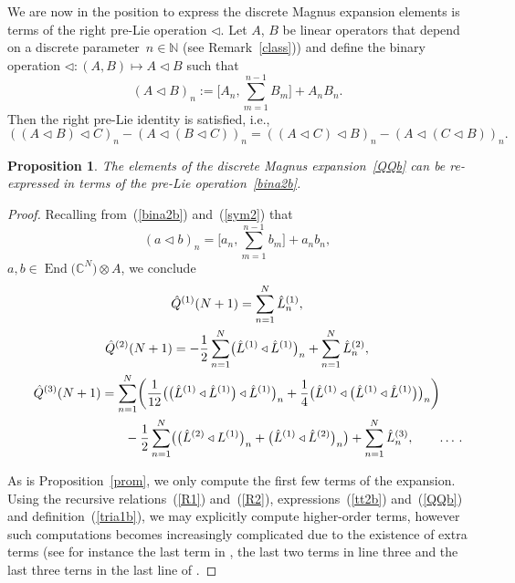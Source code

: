 \documentclass[10pt,a4paper]{amsart}
\numberwithin{equation}{section}
\newtheorem{pro}[thm]{Proposition}
\theoremstyle{definition}
\DeclareMathOperator{\EEnd}{End}%
\def\mathfrak#1{#1}%
\def\mathcal#1{#1}%
\begin{document}
We are now in the position to express the discrete Magnus
expansion elements is terms of the right pre-Lie operation $\triangleleft$.
Let $A$, $B$ be linear operators that depend on a discrete parameter~${n\in {\mathbb N}}$ (see Remark~\ref{class}))
and define the binary operation
$ \triangleleft\colon (A, B) \mapsto A \triangleleft B$ such that
\begin{equation}
(A\triangleleft B)_n := \Biggl[A_n, \sum_{m=1}^{n-1} B_m \Biggr] +A_n B_n. \label{bina2b}
\end{equation}
Then the right pre-Lie identity is satisfied, i.e.,
\begin{equation}
( (A \triangleleft B) \triangleleft C)_n- ( A \triangleleft (B \triangleleft C))_n =( (A \triangleleft C) \triangleleft B)_n- (A \triangleleft(C \triangleleft B))_n. \label{sym2}
\end{equation}

\begin{pro}
The elements of the discrete Magnus expansion~\eqref{QQb} can be re-expressed in terms of the pre-Lie operation~\eqref{bina2b}.
\end{pro}
\begin{proof}
Recalling from~(\ref{bina2b}) and~(\ref{sym2}) that
\begin{equation}
(a \triangleleft b)_n = \Biggl[a_n, \sum_{m=1}^{n-1}b_m\Biggr] + a_n b_n, \label{tria1b}
\end{equation}
$a,b \in \EEnd\bigl({\mathbb C}^{\mathcal N}\bigr) \otimes {\mathfrak A}$, we conclude
\begin{gather*}
 \hat {\mathcal Q}^{(1)}(N+1) = \sum_{n=1}^N\hat L^{(1)}_n, \cr
 \hat {\mathcal Q}^{(2)}(N+1) =-\frac{1}{2} \sum_{n=1}^N
 \bigl(\hat L^{(1)} \triangleleft \hat L^{(1)}\bigr)_n +\sum_{n=1}^N\hat L_n^{(2)},\nonumber\\
 \hat {\mathcal Q}^{(3)}(N+1)= \sum_{n=1}^N\biggl(
\frac{1}{12} \bigl(\bigl(\hat L^{(1)} \triangleleft \hat L^{(1)}\bigr) \triangleleft \hat L^{(1)}\bigr)_n +\frac{1}{4}
\bigl(\hat L^{(1)} \triangleleft \bigl(\hat L^{(1)} \triangleleft \hat L^{(1)}\bigr)\bigr)_n \biggr)\cr
\hphantom{\hat {\mathcal Q}^{(3)}(N+1)= \sum_{n=1}^N\biggl(}{}
 -\frac{1}{2} \sum_{n=1}^N\bigl(\bigl(\hat L^{(2)} \triangleleft L^{(1)}\bigr)_n+ \bigl(\hat L^{(1)}\triangleleft \hat L^{(2)}\bigr)_n\bigr)
+ \sum_{n=1}^N \hat L_n^{(3)}, \qquad \dots\,. \nonumber
\end{gather*}

As is Proposition~\ref{prom}, we only compute the first few terms of the expansion. Using the recursive relations~(\ref{R1}) and~(\ref{R2}), expressions~(\ref{tt2b}) and~(\ref{QQb}) and definition~(\ref{tria1b}), we may explicitly compute higher-order terms, however such computations becomes increasingly complicated due to the existence of extra terms (see for instance the last term in \smash{$\hat {\mathcal Q}^{(2)}$}, the last two terms in line three \smash{$\hat {\mathcal Q}^{(3)}$} and the last three terns in the last line of \smash{$\hat {\mathcal Q}^{(3)}$,~(\ref{QQb}))}.
\end{proof}
\end{document}
